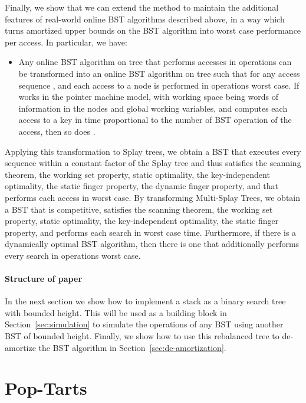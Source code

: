 \documentclass[11pt]{article}
\begin{document}
Finally, we show that we can extend the method to maintain the additional
features of real-world online BST algorithms described above, in a way
which turns amortized upper bounds on the BST algorithm into worst case
performance per access. In particular, we have:

\begin{itemize}
\item Any online BST algorithm  on tree  that performs  accesses
in  operations can be transformed into an online BST
algorithm  on tree  such that for any access sequence ,
 and each access to a node is performed in  operations worst case.
If  works in the pointer machine model, with working space being 
words of information in the nodes and  global working variables, and
computes each access to a key in time proportional to the number of BST
operation of the access, then so does .

\end{itemize}

Applying this transformation to Splay trees, we obtain a BST that
executes every sequence within a constant factor of the Splay tree and
thus satisfies the scanning theorem, the working set property, static
optimality, the key-independent optimality, the static finger
property, the dynamic finger property, and that performs each access
in  worst case. 
By transforming Multi-Splay Trees, we obtain a BST that
is  competitive, satisfies the scanning theorem, the
working set property, static optimality, the key-independent
optimality, the static finger property, and
performs each search in  worst case time. 
Furthermore, if there is a dynamically optimal BST algorithm, then
there is one that additionally performs every search in 
operations worst case.

\paragraph{Structure of paper}

In the next section we show how to implement a stack as a binary
search tree with bounded height. This will be used as a building block
in Section~\ref{sec:simulation} to simulate the operations of any BST
using another BST of bounded height. Finally, we show how to use this
rebalanced tree to de-amortize the BST algorithm in Section~\ref{sec:de-amortization}.

\section{Pop-Tarts}
\end{document}

